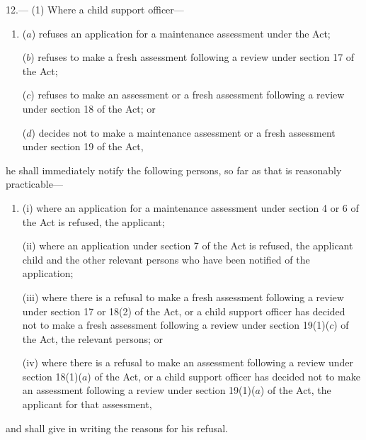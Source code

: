 \documentclass[a4paper]{article}
\begin{document}
12.—%
%
%
%
%
(1) Where a child support officer—
\begin{enumerate}\item[]
($a$) refuses an application for a maintenance assessment under the Act;

($b$) refuses to make a fresh assessment following a review under section 17 of the Act;

($c$) refuses to make an assessment or a fresh assessment following a review under section 18 of the Act; or

($d$) decides not to make a maintenance assessment or a fresh assessment under section 19 of the Act,
\end{enumerate}
he shall immediately notify the following persons, so far as that is reasonably practicable—
\begin{enumerate}\item[]
(i) where an application for a maintenance assessment under section 4 or 6 of the Act is refused, the applicant;

(ii) where an application under section 7 of the Act is refused, the applicant child and the other relevant persons who have been notified of the application;

(iii) where there is a refusal to make a fresh assessment following a review under section 17 or 18(2) of the Act, or a child support officer has decided not to make a fresh assessment following a review under section 19(1)($c$) of the Act, the relevant persons; or

(iv) where there is a refusal to make an assessment following a review under section 18(1)($a$) of the Act, or a child support officer has decided not to make an assessment following a review under section 19(1)($a$) of the Act, the applicant for that assessment,
\end{enumerate}
and shall give in writing the reasons for his refusal.
\end{document}
